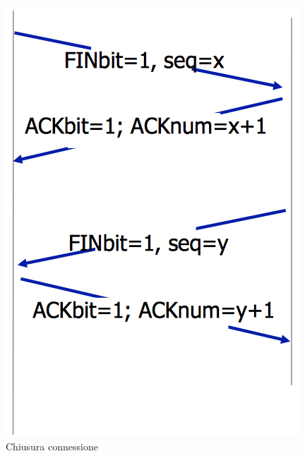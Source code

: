 \documentclass[12pt]{article}
\begin{document}
\begin{figure}[!hbpt]
\begin{minipage}{.45\textwidth}
    \includegraphics[width=\linewidth]{images/fin.png}
    \caption{Chiusura connessione}
    \label{fig:fin}
  \end{minipage}\hfill
\end{figure}
\end{document}
